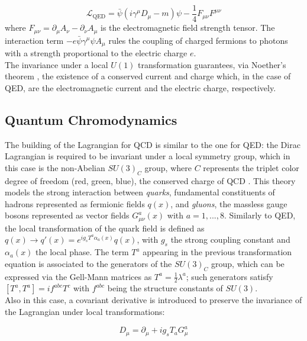 \begin{equation}\label{eq:SM_BSM/QED/QED_L}
    \mathcal{L}_\text{QED} = \bar{\psi} (i\gamma^\mu D_\mu - m) \psi - \frac{1}{4} F_{\mu\nu} F^{\mu\nu}
\end{equation}
where $F_{\mu\nu} = \partial_\mu A_\nu - \partial_\nu A_\mu$ is the electromagnetic field strength tensor. The interaction term $-e \bar{\psi} \gamma^\mu \psi A_\mu$ rules the coupling of charged fermions to photons with a strength proportional to the electric charge $e$.\\
The invariance under a local $U(1)$ transformation guarantees, via Noether's theorem \cite{Noether}, the existence of a conserved current and charge which, in the case of QED, are the electromagnetic current and the electric charge, respectively.

\subsection{Quantum Chromodynamics}\label{subsec:SM_BSM/SM/QCD}
The building of the Lagrangian for QCD is similar to the one for QED: the Dirac Lagrangian is required to be invariant under a local symmetry group, which in this case is the non-Abelian $SU(3)_C$ group, where $C$ represents the triplet color degree of freedom (red, green, blue), the conserved charge of QCD \cite{Greiner_QCD}. 
This theory models the strong interaction between \textit{quarks}, fundamental constituents of hadrons represented as fermionic fields $q(x)$, and \textit{gluons}, the massless gauge bosons represented as vector fields $G_{\mu\nu}^a(x)$ with $a=1,...,8$.
Similarly to QED, the local transformation of the quark field is defined as $q(x) \to q'(x)= e^{i g_sT^a \alpha_a(x)}q(x)$, with $g_s$ the strong coupling constant and $\alpha_a(x)$ the local phase. The term $T^a$ appearing in the previous transformation equation is associated to the generators of the $SU(3)_C$ group, which can be expressed via the Gell-Mann matrices as $T^a = \frac{1}{2} \lambda^a$; such generators satisfy $[T^a, T^a] = i f^{abc} T^c$ with $f^{abc}$ being the structure constants of $SU(3)$.\\
Also in this case, a covariant derivative is introduced to preserve the invariance of the Lagrangian under local transformations:

\begin{equation}\label{eq:SM_BSM/QCD/cov_der}
    D_\mu = \partial_\mu + i g_s T_{a} G_\mu^a
\end{equation}

